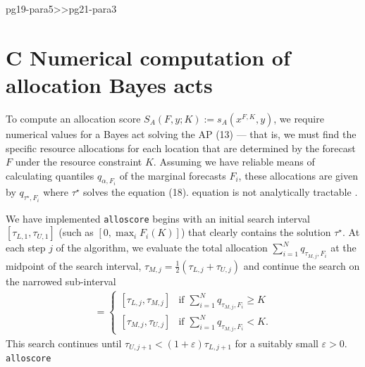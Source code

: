 \documentclass{article}
\begin{document}
\begin{mybox}{pg19-para5>>pg21-para3}
  \section*{C \quad Numerical computation of allocation Bayes acts}
  \label{sec:a:numeric}

To compute an allocation score $S_A(F,y;K) := s_A(x^{F,K},y)$, we require numerical values for a Bayes act solving the
AP (13) --- that is, we must find the specific resource allocations for each location that are determined by
the forecast $F$ under the resource constraint $K$. Assuming we have reliable means of calculating quantiles
$q_{\alpha,F_i}$ of the marginal forecasts $F_i$, these allocations are given by $q_{\tau^{\star},F_i}$ where
$\tau^{\star}$ solves the equation (18). \DIFdelbegin {}\DIFdelend \DIFaddbegin {}\DIFaddend equation is not analytically tractable \DIFdelbegin {}\DIFdelend \DIFaddbegin {}\DIFaddend .

We have implemented \DIFdelbegin {}\DIFdelend \DIFaddbegin {}
{\color{blue}\verb`alloscore`} \DIFaddend begins with an initial search interval $[\tau_{L,1}, \tau_{U,1}]$
(such as $[0,\max_{i}F_i(K)]$) that clearly contains the solution
$\tau^{\star}$. At each step $j$ of the algorithm, we evaluate the total
allocation $\sum_{i=1}^N q_{\tau_{M,j},F_i}$ at the midpoint of the search
interval, $\tau_{M,j} = \frac{1}{2}(\tau_{L,j} + \tau_{U,j})$ and continue the
search on the narrowed sub-interval
    \begin{align}
      [\tau_{L,j+1},\tau_{U,j+1}] =
      \begin{cases}
        [\tau_{L,j}, \tau_{M,j}] & \text{if } \sum_{i=1}^N q_{\tau_{M,j},F_i} \geq K \\
        [\tau_{M,j}, \tau_{U,j}] & \text{if } \sum_{i=1}^N q_{\tau_{M,j},F_i} < K.
      \end{cases} \nonumber
    \end{align}
    This search continues until $\tau_{U,j+1} < (1+\varepsilon)\tau_{L,j+1}$ 
    for a suitably small $\varepsilon>0$. 
    \DIFdelbegin {}%
    {\color{red}\verb`alloscore`}
    \DIFdelend 


\end{mybox}
\end{document}
